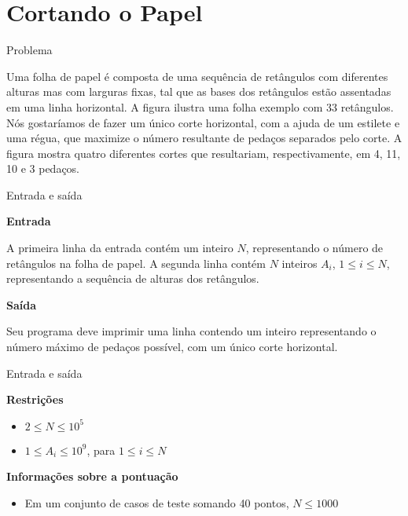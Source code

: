 \section{Cortando o Papel}

\begin{frame}[fragile]{Problema}

Uma folha de papel é composta de uma sequência de retângulos com diferentes alturas mas com
larguras fixas, tal que as bases dos retângulos estão assentadas em uma linha horizontal. A figura
ilustra uma folha exemplo com 33 retângulos. Nós gostaríamos de fazer um único corte horizontal,
com a ajuda de um estilete e uma régua, que maximize o número resultante de pedaços separados pelo
corte. A figura mostra quatro diferentes cortes que resultariam, respectivamente, em 4, 11, 10 e 3
pedaços.

\end{frame}



\begin{frame}[fragile]{Entrada e saída}

\textbf{Entrada}

A primeira linha da entrada contém um inteiro $N$, representando o número de retângulos na folha de
papel. A segunda linha contém $N$ inteiros $A_i$, $1\leq i\leq N$, representando a sequência de
alturas dos retângulos.

\vspace{0.1in}

\textbf{Saída}

Seu programa deve imprimir uma linha contendo um inteiro representando o número máximo de pedaços
possível, com um único corte horizontal.

\end{frame}

\begin{frame}[fragile]{Entrada e saída}

\textbf{Restrições}

\begin{itemize}
    \item $2\leq N\leq 10^5$
    \item $1\leq A_i\leq 10^9$, para $1\leq i\leq N$
\end{itemize}

\vspace{0.1in}

\textbf{Informações sobre a pontuação}

\begin{itemize}
    \item Em um conjunto de casos de teste somando 40 pontos, $N\leq 1000$
\end{itemize}
\end{frame}

